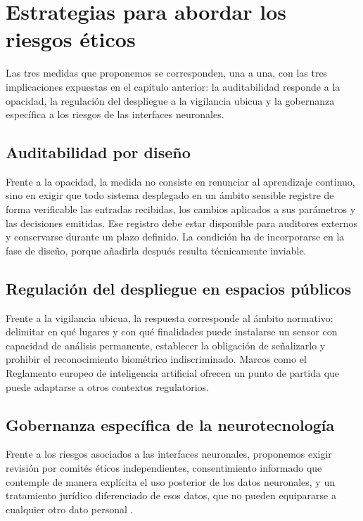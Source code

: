 \documentclass[a4paper,11pt,oneside]{book}
\begin{document}
\section{Estrategias para abordar los riesgos éticos}
\label{sec:estrategias}

Las tres medidas que proponemos se corresponden, una a una, con las tres
implicaciones expuestas en el capítulo anterior: la auditabilidad responde a la
opacidad, la regulación del despliegue a la vigilancia ubicua y la gobernanza
específica a los riesgos de las interfaces neuronales.

\subsection{Auditabilidad por diseño}

Frente a la opacidad, la medida no consiste en renunciar al aprendizaje continuo,
sino en exigir que todo sistema desplegado en un ámbito sensible registre de forma
verificable las entradas recibidas, los cambios aplicados a sus parámetros y las
decisiones emitidas. Ese registro debe estar disponible para auditores externos y
conservarse durante un plazo definido. La condición ha de incorporarse en la fase
de diseño, porque añadirla después resulta técnicamente inviable.

\subsection{Regulación del despliegue en espacios públicos}

Frente a la vigilancia ubicua, la respuesta corresponde al ámbito normativo:
delimitar en qué lugares y con qué finalidades puede instalarse un sensor con
capacidad de análisis permanente, establecer la obligación de señalizarlo y
prohibir el reconocimiento biométrico indiscriminado. Marcos como el Reglamento
europeo de inteligencia artificial ofrecen un punto de partida que puede adaptarse
a otros contextos regulatorios.

\subsection{Gobernanza específica de la neurotecnología}

Frente a los riesgos asociados a las interfaces neuronales, proponemos exigir
revisión por comités éticos independientes, consentimiento informado que
contemple de manera explícita el uso posterior de los datos neuronales, y un
tratamiento jurídico diferenciado de esos datos, que no pueden equipararse a
cualquier otro dato personal \parencite{yuste2017}.
\end{document}

